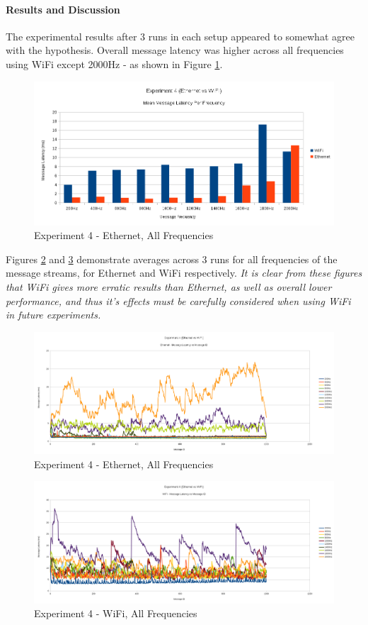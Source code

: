 \documentclass[../dissertation.tex]{subfiles}
\begin{document}
\paragraph{Results and Discussion} The experimental results after 3 runs in each setup appeared to somewhat agree with the hypothesis. Overall message latency was higher across all frequencies using WiFi except 2000Hz - as shown in Figure \ref{exp4-means-all-freq}.

\begin{figure}[H]
\centering
\includegraphics[width=\textwidth]{images/experiment4/mean_per_frequency.png}
\caption{Experiment 4 - Ethernet, All Frequencies}
\label{exp4-means-all-freq}
\end{figure}

Figures \ref{exp4-ethernet-all-freq} and \ref{exp4-wifi-all-freq} demonstrate averages across 3 runs for all frequencies of the message streams, for Ethernet and WiFi respectively. \textit{It is clear from these figures that WiFi gives more erratic results than Ethernet, as well as overall lower performance, and thus it's effects must be carefully considered when using WiFi in future experiments.}

\begin{figure}[H]
\centering
\includegraphics[width=\textwidth]{images/experiment4/ethernet_mean_times_pretty.png}
\caption{Experiment 4 - Ethernet, All Frequencies}
\label{exp4-ethernet-all-freq}
\end{figure}

\begin{figure}[H]
\centering
\includegraphics[width=\textwidth]{images/experiment4/wifi_mean_times_pretty.png}
\caption{Experiment 4 - WiFi, All Frequencies}
\label{exp4-wifi-all-freq}
\end{figure}
\end{document}
